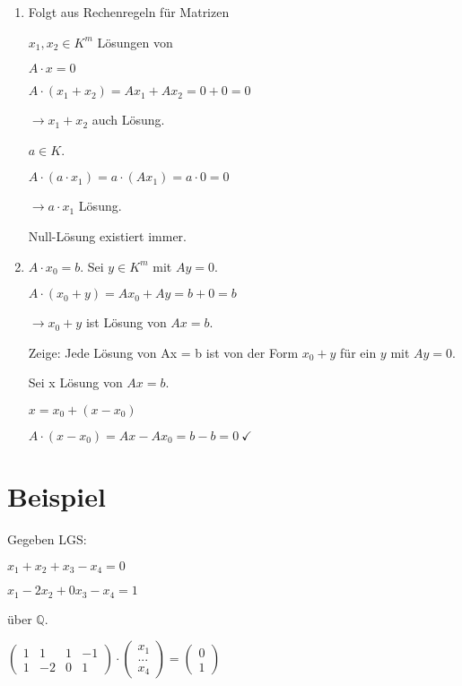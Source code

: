 \documentclass[a4paper, openany]{book}
\begin{document}
    \begin{enumerate}[label=(\alph*)] 
      \item Folgt aus Rechenregeln für Matrizen

      $x_1, x_2 \in K^m$ Lösungen von 

      \begin{center}
        $A \cdot x = 0$
      \end{center}

      $A \cdot (x_1+x_2) = Ax_1 + Ax_2 = 0 + 0 = 0$ 

      $\rightarrow x_1 + x_2$ auch Lösung.

      $a \in K$.

      $A \cdot (a \cdot x_1) = a \cdot (Ax_1) = a \cdot 0 = 0 $

      $\rightarrow a \cdot x_1$ Lösung.

      Null-Lösung existiert immer.

      \item $A \cdot x_0 = b$. Sei $y \in K^m$ mit $Ay = 0$.

      $A \cdot (x_0 + y) = Ax_0 + Ay = b + 0 = b$

      $\rightarrow x_0 + y$ ist Lösung von $Ax = b$.

      \par \medskip

      Zeige: Jede Lösung von Ax = b ist von der Form $x_0 + y$ für ein $y$ mit $Ay = 0$.

      Sei x Lösung von $Ax = b$.

      $x = x_0 + (x-x_0)$

      $A \cdot (x - x_0) = Ax - Ax_0 = b - b = 0 \ \checkmark$
    \end{enumerate}

    \section{Beispiel}

    Gegeben LGS:

    \begin{center}

      $x_1 + x_2 + x_3 - x_4 = 0$

      $x_1 - 2x_2 + 0 x_3 - x_4 = 1$ 

    \end{center}

    über $\mathbb{Q}$.

    $\begin{pmatrix}1 & 1 & 1 & -1 \\ 1 & -2 & 0 & 1 \end{pmatrix} \cdot \begin{pmatrix}x_1 \\ ... \\ x_4 \end{pmatrix} = \begin{pmatrix}0 \\ 1 \end{pmatrix}$
\end{document}
